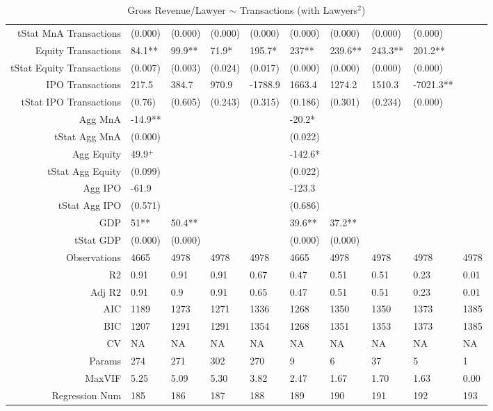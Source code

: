 \begin{table}[ht]
\begin{tabular}{rlllllllll}
  tStat MnA Transactions & (0.000) & (0.000) & (0.000) & (0.000) & (0.000) & (0.000) & (0.000) & (0.000) &  \\ 
  Equity Transactions & 84.1** & 99.9** & 71.9* & 195.7* & 237** & 239.6** & 243.3** & 201.2** &  \\ 
  tStat Equity Transactions & (0.007) & (0.003) & (0.024) & (0.017) & (0.000) & (0.000) & (0.000) & (0.000) &  \\ 
  IPO Transactions & 217.5 & 384.7 & 970.9 & -1788.9 & 1663.4 & 1274.2 & 1510.3 & -7021.3** &  \\ 
  tStat IPO Transactions & (0.76) & (0.605) & (0.243) & (0.315) & (0.186) & (0.301) & (0.234) & (0.000) &  \\ 
  Agg MnA & -14.9** &  &  &  & -20.2* &  &  &  &  \\ 
  tStat Agg MnA & (0.000) &  &  &  & (0.022) &  &  &  &  \\ 
  Agg Equity & 49.9$^{+}$ &  &  &  & -142.6* &  &  &  &  \\ 
  tStat Agg Equity & (0.099) &  &  &  & (0.022) &  &  &  &  \\ 
  Agg IPO & -61.9 &  &  &  & -123.3 &  &  &  &  \\ 
  tStat Agg IPO & (0.571) &  &  &  & (0.686) &  &  &  &  \\ 
  GDP & 51** & 50.4** &  &  & 39.6** & 37.2** &  &  &  \\ 
  tStat GDP & (0.000) & (0.000) &  &  & (0.000) & (0.000) &  &  &  \\ 
  Observations & 4665 & 4978 & 4978 & 4978 & 4665 & 4978 & 4978 & 4978 & 4978 \\ 
  R2 & 0.91 & 0.91 & 0.91 & 0.67 & 0.47 & 0.51 & 0.51 & 0.23 & 0.01 \\ 
  Adj R2 & 0.91 & 0.9 & 0.91 & 0.65 & 0.47 & 0.51 & 0.51 & 0.23 & 0.01 \\ 
  AIC & 1189 & 1273 & 1271 & 1336 & 1268 & 1350 & 1350 & 1373 & 1385 \\ 
  BIC & 1207 & 1291 & 1291 & 1354 & 1268 & 1351 & 1353 & 1373 & 1385 \\ 
  CV & NA & NA & NA & NA & NA & NA & NA & NA & NA \\ 
  Params & 274 & 271 & 302 & 270 & 9 & 6 & 37 & 5 & 1 \\ 
  MaxVIF & 5.25 & 5.09 & 5.30 & 3.82 & 2.47 & 1.67 & 1.70 & 1.63 & 0.00 \\ 
  Regression Num & 185 & 186 & 187 & 188 & 189 & 190 & 191 & 192 & 193 \\ 
   \hline
\end{tabular}
\caption{Gross Revenue/Lawyer $\sim$ Transactions (with Lawyers$^2$)} 
\end{table}
